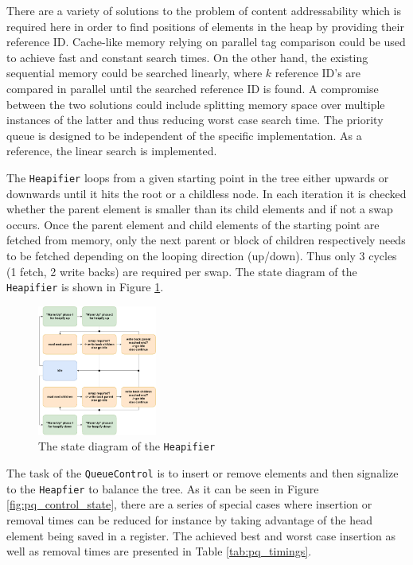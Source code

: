 \documentclass[conference]{IEEEtran}
\begin{document}
There are a variety of solutions to the problem of content addressability which is required here in order to find positions of elements in the heap by providing
their reference ID. Cache-like memory relying on parallel tag comparison could be used to achieve fast and constant search times. On the other hand, the 
existing sequential memory could be searched linearly, where $k$ reference ID's are compared in parallel until the searched reference ID is found.
A compromise between the two solutions could include splitting memory space over multiple instances of the latter and thus reducing worst case search time.
The priority queue is designed to be independent of the specific implementation. As a reference, the linear search is implemented.

The \texttt{Heapifier} loops from a given starting point in the tree either upwards or downwards until it hits the root or a childless node. In each iteration 
it is checked whether the parent element is smaller than its child elements and if not a swap occurs. Once the parent element and child elements of the starting 
point are fetched from memory, only the next parent or block of children respectively needs to be fetched depending on the looping direction (up/down). Thus 
only 3 cycles (1 fetch, 2 write backs) are required per swap. The state diagram of the \texttt{Heapifier} is shown in Figure \ref{fig:pq_heapifier_state}.

\begin{figure}
	\centering
	\includegraphics[width=0.35\textwidth]{HeapifierStateDiagram.pdf}
	\caption{The state diagram of the \texttt{Heapifier}}
	\label{fig:pq_heapifier_state}
\end{figure}

The task of the \texttt{QueueControl} is to insert or remove elements and then signalize to the \texttt{Heapfier} to balance the tree. As it can be seen in Figure 
\ref{fig:pq_control_state}, there are a series of special cases where insertion or removal times can be reduced for instance by taking advantage of the head element
being saved in a register. The achieved best and worst case insertion as well as removal times are presented in Table \ref{tab:pq_timings}.
\end{document}
